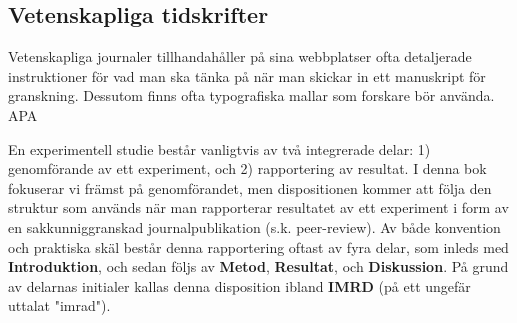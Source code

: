 \documentclass[
]{book}
\begin{document}
\hypertarget{sub08.3.2}{%
\subsection{Vetenskapliga tidskrifter}\label{sub08.3.2}}

Vetenskapliga journaler tillhandahåller på sina webbplatser ofta detaljerade instruktioner för vad man ska tänka på när man skickar in ett manuskript för granskning. Dessutom finns ofta typografiska mallar som forskare bör använda. APA

En experimentell studie består vanligtvis av två integrerade delar: 1) genomförande av ett experiment, och 2) rapportering av resultat. I denna bok fokuserar vi främst på genomförandet, men dispositionen kommer att följa den struktur som används när man rapporterar resultatet av ett experiment i form av en sakkunniggranskad journalpublikation (s.k. peer-review). Av både konvention och praktiska skäl består denna rapportering oftast av fyra delar, som inleds med \textbf{Introduktion}, och sedan följs av \textbf{Metod}, \textbf{Resultat}, och \textbf{Diskussion}. På grund av delarnas initialer kallas denna disposition ibland \textbf{IMRD} (på ett ungefär uttalat "imrad").
\end{document}

